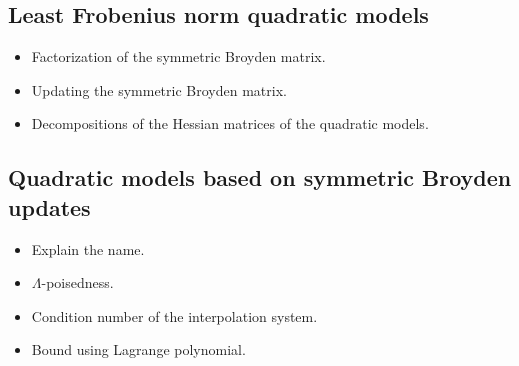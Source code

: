\subsection{Least Frobenius norm quadratic models}

\begin{itemize}
    \item Factorization of the symmetric Broyden matrix.
    \item Updating the symmetric Broyden matrix.
    \item Decompositions of the Hessian matrices of the quadratic models.
\end{itemize}

\subsection{Quadratic models based on symmetric Broyden updates}

\begin{itemize}
    \item Explain the name.
    \item $\Lambda$-poisedness.     
    \item Condition number of the interpolation system.
    \item Bound using Lagrange polynomial.
\end{itemize}

